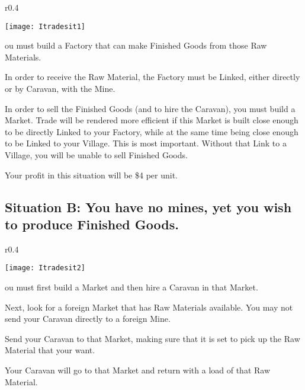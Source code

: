 \begin{wrapfigure}{r}{0.4\textwidth}
    \vspace{-20pt}
    \begin{center}
        \texttt{[image: Itradesit1]} %
    \end{center}
    \vspace{-20pt}
\end{wrapfigure}

ou must build a Factory that can make Finished Goods from those Raw Materials.

In order to receive the Raw Material, the Factory must be Linked, either directly or by Caravan, with the Mine.

In order to sell the Finished Goods (and to hire the Caravan), you must build a Market. Trade will be rendered more efficient if this Market is built close enough to be directly Linked to your Factory, while at the same time being close enough to be Linked to your Village. This is most important. Without that Link to a Village, you will be unable to sell Finished Goods.

Your profit in this situation will be \$4 per unit.

\subsection{\textsf{Situation B: You have no mines, yet you wish to produce Finished Goods.}}

\begin{wrapfigure}{r}{0.4\textwidth}
    \vspace{-20pt}
    \begin{center}
        \texttt{[image: Itradesit2]} %
    \end{center}
    \vspace{-20pt}
\end{wrapfigure}

ou must first build a Market and then hire a Caravan in that Market.

Next, look for a foreign Market that has Raw Materials available. You may not send your Caravan directly to a foreign Mine.

Send your Caravan to that Market, making sure that it is set to pick up the Raw Material that your want.

Your Caravan will go to that Market and return with a load of that Raw Material.


